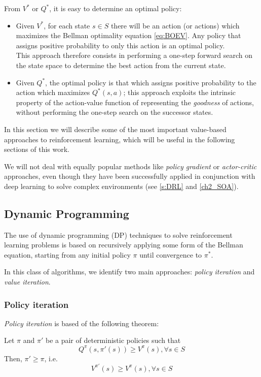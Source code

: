 From $V^*$ or $Q^*$, it is easy to determine an optimal policy:
\begin{itemize}
    \item Given $V^*$, for each state $s \in S$ there will be an action (or 
    actions) which maximizes the Bellman optimality equation \eqref{eq:BOEV}. 
    Any policy that assigns positive probability to only this action is an 
    optimal policy. \\
    This approach therefore consists in performing a one-step forward search on 
    the state space to determine the best action from the current state.
    \item Given $Q^*$, the optimal policy is that which assigns positive 
    probability to the action which maximizes $Q^*(s, a)$; this approach 
    exploits the intrinsic property of the action-value function of representing 
    the \textit{goodness} of actions, without performing the one-step search 
    on the successor states. 
\end{itemize}

In this section we will describe some of the most important value-based 
approaches to reinforcement learning, which will be useful in the following 
sections of this work. 

We will not deal with equally popular methods like \textit{policy gradient} or 
\textit{actor-critic} approaches, even though they have been successfully applied
in conjunction with deep learning to solve complex environments (see \ref{s:DRL}
and \ref{ch2_SOA}).

\subsection{Dynamic Programming}
The use of dynamic programming (DP) techniques to solve reinforcement learning 
problems is based on recursively applying some form of the Bellman equation, 
starting from any initial policy $\pi$ until convergence to $\pi^*$.

In this class of algorithms, we identify two main approaches: \textit{policy 
iteration} and \textit{value iteration}.

\subsubsection{Policy iteration}
\textit{Policy iteration} is based of the following theorem:
\begin{theorem} \label{th:pol_imp}
    Let $\pi$ and $\pi'$ be a pair of deterministic policies such that
    \[
        Q^\pi(s, \pi'(s)) \ge V^\pi(s), \forall s \in S 
    \]
    Then, $\pi' \ge \pi$, i.e. 
    \[
        V^{\pi'}(s) \ge V^{\pi}(s), \forall s \in S
    \]
\end{theorem}

